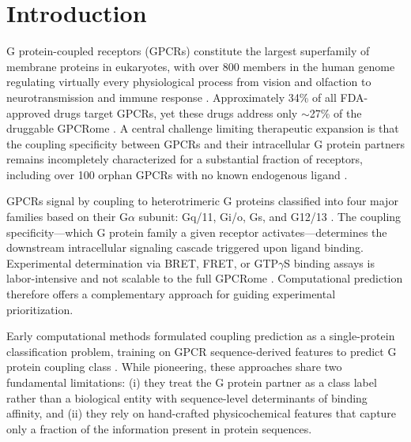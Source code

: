\documentclass[11pt,a4paper]{article}
\begin{document}
\section{Introduction}

G protein-coupled receptors (GPCRs) constitute the largest superfamily of membrane proteins in eukaryotes, with over 800 members in the human genome regulating virtually every physiological process from vision and olfaction to neurotransmission and immune response \cite{pierce2002seven, rosenbaum2009structure}. Approximately 34\% of all FDA-approved drugs target GPCRs, yet these drugs address only $\sim$27\% of the druggable GPCRome \cite{hauser2017trends, sriram2019gprotein}. A central challenge limiting therapeutic expansion is that the coupling specificity between GPCRs and their intracellular G protein partners remains incompletely characterized for a substantial fraction of receptors, including over 100 orphan GPCRs with no known endogenous ligand \cite{tang2023orphan}.

GPCRs signal by coupling to heterotrimeric G proteins classified into four major families based on their G$\alpha$ subunit: Gq/11, Gi/o, Gs, and G12/13 \cite{wettschureck2005mammalian}. The coupling specificity---which G protein family a given receptor activates---determines the downstream intracellular signaling cascade triggered upon ligand binding. Experimental determination via BRET, FRET, or GTP$\gamma$S binding assays is labor-intensive and not scalable to the full GPCRome \cite{olsen2020gprotein}. Computational prediction therefore offers a complementary approach for guiding experimental prioritization.

Early computational methods formulated coupling prediction as a single-protein classification problem, training on GPCR sequence-derived features to predict G protein coupling class \cite{roller2001prediction, ono2006prediction, sgourakis2005method, yabuki2005gprotein}. While pioneering, these approaches share two fundamental limitations: (i) they treat the G protein partner as a class label rather than a biological entity with sequence-level determinants of binding affinity, and (ii) they rely on hand-crafted physicochemical features that capture only a fraction of the information present in protein sequences.
\end{document}
